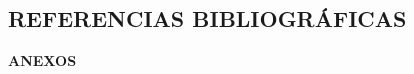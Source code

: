 \documentclass[12pt, a4paper]{article}
\begin{document}
\newpage
\break











	


	



\medspace
\vspace{2cm}
\begin{center}
	\section*{\large REFERENCIAS BIBLIOGRÁFICAS}
\end{center}
\vspace{-1cm}
\renewcommand{\refname}{} %

	

\break

\medspace
\vspace{9.5cm}
\begin{center}
	\LARGE \bf ANEXOS
\end{center}


\end{document}
